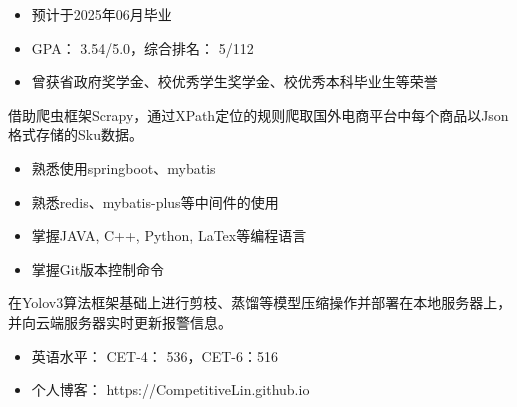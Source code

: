 


	






\begin{itemize}
	\item 预计于2025年06月毕业
\end{itemize}

\begin{itemize}
	\item GPA： 3.54/5.0，综合排名： 5/112
	\item 曾获省政府奖学金、校优秀学生奖学金、校优秀本科毕业生等荣誉
\end{itemize}

\vspace{-\topsep}

借助爬虫框架Scrapy，通过XPath定位的规则爬取国外电商平台中每个商品以Json格式存储的Sku数据。


\begin{itemize}
	\setlength\parskip{0.2ex}%
	\item 熟悉使用springboot、mybatis
	\item 熟悉redis、mybatis-plus等中间件的使用
	\item 掌握JAVA, C++, Python, LaTex等编程语言
	\item 掌握Git版本控制命令
\end{itemize}

\vspace{-3mm}


在Yolov3算法框架基础上进行剪枝、蒸馏等模型压缩操作并部署在本地服务器上，并向云端服务器实时更新报警信息。


\begin{itemize}	
	\item 英语水平： CET-4： 536，CET-6：516
	\item 个人博客： https://CompetitiveLin.github.io
\end{itemize}



